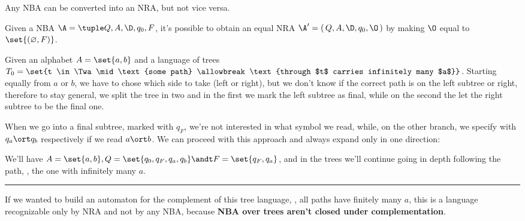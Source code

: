 \documentclass[oneside]{academica}
\begin{document}
\begin{theorem}\label{thm:nba_nra}
  Any NBA can be converted into an NRA, but not vice versa.
\end{theorem}

\begin{proof*}
  Given a NBA $\A = \NBA$, it's possible to obtain an equal NRA $\A' = (\,Q, A, \D,\allowbreak q_0, \O\,)$ by making $\O$ equal to $\set{(\emptyset, F)}$.
\end{proof*}

\begin{exercise}\label{ex:tree_t0}
  Given an alphabet $A = \set{a,b}$ and a language of trees $T_0 = \set{t \in \Twa \mid \text{some path} \allowbreak \text{through $t$ carries infinitely many $a$}}$.
  Starting equally from $a$ or $b$, we have to chose which side to take (left or right), but we don't know if the correct path is on the left subtree or right, therefore to stay general, we split the tree in two and in the first we mark the left subtree as final, while on the second the let the right subtree to be the final one.
  \begin{center}
    
  \end{center}
  When we go into a final subtree, marked with $q_F$, we're not interested in what symbol we read, while, on the other branch, we specify with $q_a \ort q_b$ respectively if we read $a \ort b$.
  We can proceed with this approach and always expand only in one direction:
  \begin{center}
    
  \end{center}
  We'll have $A = \set{a,b}, Q=\set{q_0,q_F,q_a,q_b} \andt F = \set{q_F,q_a}$, and in the trees we'll continue going in depth following the  path, \ie, the one with infinitely many $a$.
  \textcolor{orange!140}{\rule{\textwidth}{1.5pt}}
  If we wanted to build an automaton for the complement of this tree language, \ie, all paths have finitely many $a$, this is a language recognizable only by NRA and not by any NBA, because \textbf{NBA over trees aren't closed under complementation}.
\end{exercise}
\end{document}
